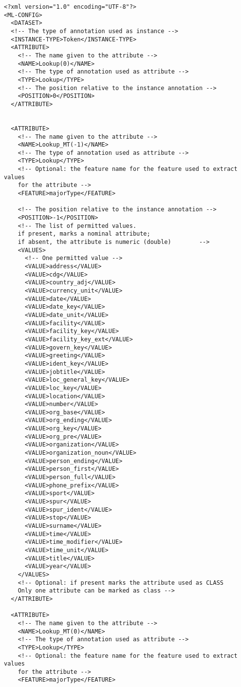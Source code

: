 \begin{verbatim}
<?xml version="1.0" encoding="UTF-8"?>
<ML-CONFIG>
  <DATASET>
  <!-- The type of annotation used as instance -->
  <INSTANCE-TYPE>Token</INSTANCE-TYPE>
  <ATTRIBUTE>
    <!-- The name given to the attribute -->
    <NAME>Lookup(0)</NAME>
    <!-- The type of annotation used as attribute -->
    <TYPE>Lookup</TYPE>
    <!-- The position relative to the instance annotation -->
    <POSITION>0</POSITION>
  </ATTRIBUTE>


  <ATTRIBUTE>
    <!-- The name given to the attribute -->
    <NAME>Lookup_MT(-1)</NAME>
    <!-- The type of annotation used as attribute -->
    <TYPE>Lookup</TYPE>
    <!-- Optional: the feature name for the feature used to extract values
    for the attribute -->
    <FEATURE>majorType</FEATURE>

    <!-- The position relative to the instance annotation -->
    <POSITION>-1</POSITION>
    <!-- The list of permitted values.
    if present, marks a nominal attribute;
    if absent, the attribute is numeric (double)        -->
    <VALUES>
      <!-- One permitted value -->
      <VALUE>address</VALUE>
      <VALUE>cdg</VALUE>
      <VALUE>country_adj</VALUE>
      <VALUE>currency_unit</VALUE>
      <VALUE>date</VALUE>
      <VALUE>date_key</VALUE>
      <VALUE>date_unit</VALUE>
      <VALUE>facility</VALUE>
      <VALUE>facility_key</VALUE>
      <VALUE>facility_key_ext</VALUE>
      <VALUE>govern_key</VALUE>
      <VALUE>greeting</VALUE>
      <VALUE>ident_key</VALUE>
      <VALUE>jobtitle</VALUE>
      <VALUE>loc_general_key</VALUE>
      <VALUE>loc_key</VALUE>
      <VALUE>location</VALUE>
      <VALUE>number</VALUE>
      <VALUE>org_base</VALUE>
      <VALUE>org_ending</VALUE>
      <VALUE>org_key</VALUE>
      <VALUE>org_pre</VALUE>
      <VALUE>organization</VALUE>
      <VALUE>organization_noun</VALUE>
      <VALUE>person_ending</VALUE>
      <VALUE>person_first</VALUE>
      <VALUE>person_full</VALUE>
      <VALUE>phone_prefix</VALUE>
      <VALUE>sport</VALUE>
      <VALUE>spur</VALUE>
      <VALUE>spur_ident</VALUE>
      <VALUE>stop</VALUE>
      <VALUE>surname</VALUE>
      <VALUE>time</VALUE>
      <VALUE>time_modifier</VALUE>
      <VALUE>time_unit</VALUE>
      <VALUE>title</VALUE>
      <VALUE>year</VALUE>
    </VALUES>
    <!-- Optional: if present marks the attribute used as CLASS
    Only one attribute can be marked as class -->
  </ATTRIBUTE>

  <ATTRIBUTE>
    <!-- The name given to the attribute -->
    <NAME>Lookup_MT(0)</NAME>
    <!-- The type of annotation used as attribute -->
    <TYPE>Lookup</TYPE>
    <!-- Optional: the feature name for the feature used to extract values
    for the attribute -->
    <FEATURE>majorType</FEATURE>


\end{verbatim}
